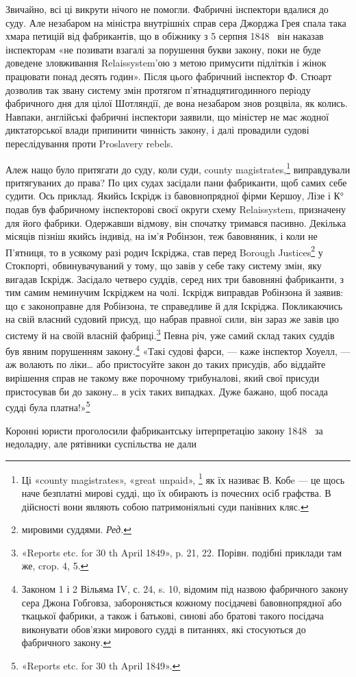 Звичайно, всі ці викрути нічого не помогли. Фабричні інспектори
вдалися до суду. Але незабаром на міністра внутрішніх
справ сера Джорджа Грея спала така хмара петицій від фабрикантів,
що в обіжнику з 5 серпня 1848~ він наказав інспекторам
«не позивати взагалі за порушення букви закону, поки не буде
доведене зловживання Relaissystem’ою з метою примусити підлітків
і жінок працювати понад десять годин». Після цього фабричний
інспектор Ф. Стюарт дозволив так звану систему змін протягом
п’ятнадцятигодинного періоду фабричного дня для цілої Шотляндії,
де вона незабаром знов розцвіла, як колись. Навпаки,
англійські фабричні інспектори заявили, що міністер не має
жодної диктаторської влади припинити чинність закону, і далі
провадили судові переслідування проти Proslavery rebels.

Алеж нащо було притягати до суду, коли суди, county magistrates,\footnote{
Ці «county magistrates», «great unpaid», \footnote*{величні неоплачувані.  \emph Ред. }
як їх називає В. Кобe — це щось наче безплатні мирові судді, що їх обирають із почесних
осіб графства. В дійсності вони являють собою патримоніяльні суди панівних
кляс.
}
виправдували притягуваних до права? По цих судах
засідали пани фабриканти, щоб самих себе судити. Ось приклад.
Якийсь Іскрідж із бавовнопрядної фірми Кершоу, Лізе і К°
подав був фабричному інспекторові своєї округи схему Relaissystem,
призначену для його фабрики. Одержавши відмову,
він спочатку тримався пасивно. Декілька місяців пізніш якийсь
індивід, на ім’я Робінзон, теж бавовняник, і коли не П’ятниця,
то в усякому разі родич Іскріджа, став перед Borough Justices\footnote*{мировими суддями. \emph {Ред.}}
у Стокпорті, обвинувачуваний у тому, що завів у себе таку
систему змін, яку вигадав Іскрідж. Засідало четверо суддів,
серед них три бавовняні фабриканти, з тим самим неминучим
Іскріджем на чолі. Іскрідж виправдав Робінзона й заявив: що є
законоправне для Робінзона, те справедливе й для Іскріджа.
Покликаючись на свій власний судовий присуд, що набрав правної
сили, він зараз же завів цю систему й на своїй власній фабриці.\footnote{
«Reports etc. for 30 th April 1849», p. 21, 22. Порівн. подібні
приклади там же, crop. 4, 5.
}
Певна річ, уже самий склад таких суддів був явним порушенням
закону.\footnote{
Законом 1 і 2 Вільяма IV, с. 24, s. 10, відомим під назвою фабричного
закону сера Джона Гобговза, забороняється кожному посідачеві
бавовнопрядної або ткацької фабрики, а також і батькові, синові або
братові такого посідача виконувати обов'язки мирового судді в питаннях,
які стосуються до фабричного закону.
} «Такі судові фарси, — каже інспектор Хоуелл, —
аж волають по ліки\dots{} або пристосуйте закон до таких присудів,
або віддайте вирішення справ не такому вже порочному трибуналові,
який свої присуди пристосував би до закону\dots{} в усіх таких
випадках. Дуже бажано, щоб посада судді була платна!»\footnote{
«Reports etc. for 30 th April 1849».
}

Коронні юристи проголосили фабрикантську інтерпретацію
закону 1848~ за недоладну, але рятівники суспільства не дали
\parbreak{}  %
